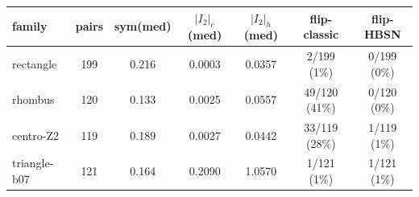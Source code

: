 \begin{tabular}{|l|c|c|c|c|c|c|}\hline
family & pairs & sym(med) & $|I_2|_c$(med) & $|I_2|_h$(med) & flip-classic & flip-HBSN \\ \hline
rectangle & 199 & 0.216 & 0.0003 & 0.0357 & 2/199 (1\%) & 0/199 (0\%) \\ \hline
rhombus & 120 & 0.133 & 0.0025 & 0.0557 & 49/120 (41\%) & 0/120 (0\%) \\ \hline
centro-Z2 & 119 & 0.189 & 0.0027 & 0.0442 & 33/119 (28\%) & 1/119 (1\%) \\ \hline
triangle-b07 & 121 & 0.164 & 0.2090 & 1.0570 & 1/121 (1\%) & 1/121 (1\%) \\ \hline
\end{tabular}
